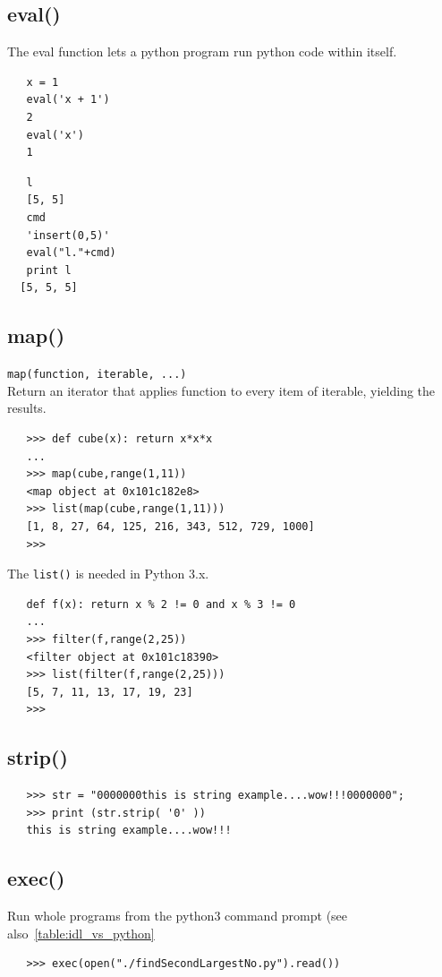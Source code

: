 \documentclass[11pt,a4paper]{article}
\begin{document}
    \subsection{eval()}  
    The eval function lets a python program run python code within itself.
    \begin{lstlisting}
   x = 1
   eval('x + 1')
   2
   eval('x')
   1
  \end{lstlisting}
    \begin{lstlisting}
   l
   [5, 5]
   cmd
   'insert(0,5)'
   eval("l."+cmd)
   print l
  [5, 5, 5]
  \end{lstlisting}

    \subsection{map()}  
    {\tt map(function, iterable, ...)} \\
    Return an iterator that applies function to every item of iterable, yielding the results.
    \begin{lstlisting}
   >>> def cube(x): return x*x*x
   ... 
   >>> map(cube,range(1,11))
   <map object at 0x101c182e8>
   >>> list(map(cube,range(1,11)))
   [1, 8, 27, 64, 125, 216, 343, 512, 729, 1000]
   >>> 
  \end{lstlisting}
    The {\tt list()} is needed in Python 3.x. 

    \begin{lstlisting}
   def f(x): return x % 2 != 0 and x % 3 != 0
   ... 
   >>> filter(f,range(2,25))
   <filter object at 0x101c18390>
   >>> list(filter(f,range(2,25)))
   [5, 7, 11, 13, 17, 19, 23]
   >>> 
  \end{lstlisting}


    \subsection{strip()}  
    \begin{lstlisting}
   >>> str = "0000000this is string example....wow!!!0000000";
   >>> print (str.strip( '0' ))
   this is string example....wow!!!
  \end{lstlisting}

    \subsection{exec()}  
    Run whole programs from the python3 command prompt (see also~\ref{table:idl_vs_python}
    \begin{lstlisting}
   >>> exec(open("./findSecondLargestNo.py").read())
  \end{lstlisting}
\end{document}
